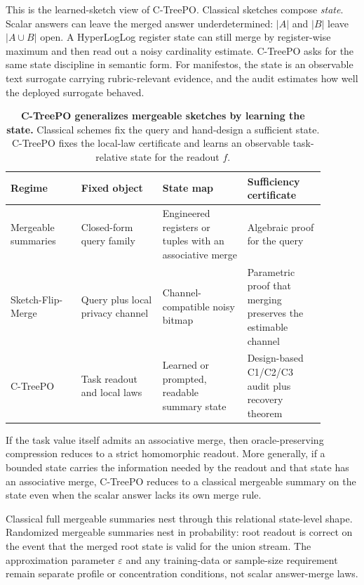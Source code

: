 This is the learned-sketch view of C-TreePO. Classical sketches compose
\emph{state}. Scalar answers can leave the merged answer underdetermined:
$|A|$ and $|B|$ leave $|A\cup B|$ open. A HyperLogLog register state can still
merge by register-wise maximum and then read out a noisy cardinality estimate.
C-TreePO asks for the same state discipline in semantic form. For manifestos,
the state is an observable text surrogate carrying rubric-relevant evidence,
and the audit estimates how well the deployed surrogate behaved.

\begin{table}[t]
\centering
\small
\renewcommand{\arraystretch}{1.12}
\begin{tabular}{p{0.20\linewidth}p{0.23\linewidth}p{0.24\linewidth}p{0.22\linewidth}}
\hline
Regime & Fixed object & State map & Sufficiency certificate \\
\hline
Mergeable summaries & Closed-form query family & Engineered registers or tuples with an associative merge & Algebraic proof for the query \citep{Agarwal2013MergeableTODS} \\
Sketch-Flip-Merge & Query plus local privacy channel & Channel-compatible noisy bitmap & Parametric proof that merging preserves the estimable channel \citep{HehirTingCormode2023SFM} \\
C-TreePO & Task readout and local laws & Learned or prompted, readable summary state & Design-based C1/C2/C3 audit plus recovery theorem \\
\hline
\end{tabular}
\caption{\textbf{C-TreePO generalizes mergeable sketches by learning the
state.} Classical schemes fix the query and hand-design a sufficient state.
C-TreePO fixes the local-law certificate and learns an observable
task-relative state for the readout $f$.}
\label{tab:learned-sketch-lineage}
\end{table}

\begin{proposition}\label{prop:mergeable-reduction}
If the task value itself admits an associative merge, then oracle-preserving
compression reduces to a strict homomorphic readout. More generally, if a
bounded state carries the information needed by the readout and that state has
an associative merge, C-TreePO reduces to a classical mergeable summary on the
state even when the scalar answer lacks its own merge rule.
\end{proposition}

Classical full mergeable summaries nest through this relational state-level
shape. Randomized mergeable summaries nest in probability: root readout is
correct on the event that the merged root state is valid for the union stream.
The approximation parameter $\varepsilon$ and any training-data or sample-size
requirement remain separate profile or concentration conditions, not scalar
answer-merge laws.
